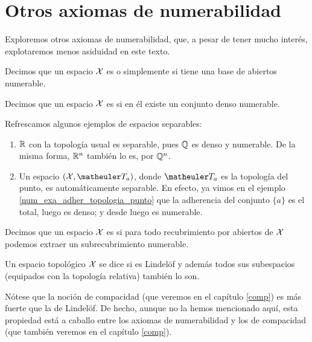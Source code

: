 \section{Otros axiomas de numerabilidad}
Exploremos otros axiomas de numerabilidad, que, a pesar de tener mucho interés, explotaremos menos asiduidad en este texto.
\begin{defi}
	Decimos que un espacio $\mathcal{X}$ es  o simplemente  si tiene una base de abiertos numerable.
\end{defi}

\begin{defi}[Separable]
	Decimos que un espacio $\mathcal{X}$ es  si en él existe un conjunto denso numerable.
\end{defi}

\begin{exa}
	Refrescamos algunos ejemplos de espacios separables:
	\begin{enumerate}
		\item $\mathbb{R}$ con la topología usual es separable, pues $\mathbb{Q}$ es denso y numerable. De la misma forma, $\mathbb{R}^n$ también lo es, por $\mathbb{Q}^n$. 
		
		\item Un espacio $(\X,\T_a)$, donde $\T_a$ es la topología del punto, es automáticamente separable. En efecto, ya vimos en el ejemplo \ref{num_exa_adher_topologia_punto} que la adherencia del conjunto $\{a\}$ es el total, luego es denso; y desde luego es numerable. \qedhere
	\end{enumerate}
\end{exa}

\begin{defi}[Lindelöf]
	\label{lindel}
	Decimos que un espacio $\mathcal{X}$ es  si para todo recubrimiento por abiertos de $\mathcal{X}$ podemos extraer un subrecubrimiento numerable.
\end{defi}
\begin{defi}
	Un espacio topológico $\mathcal{X}$ se dice  si es Lindelöf y además todos sus subespacios (equipados con la topología relativa) también lo son.
\end{defi}

\begin{obs}
	Nótese que la noción de compacidad (que veremos en el capítulo \ref{comp}) es más fuerte que la de Lindelöf. De hecho, aunque no la hemos mencionado aquí, esta propiedad está a caballo entre los axiomas de numerabilidad y los de compacidad (que también veremos en el capítulo \ref{comp}).
\end{obs}

